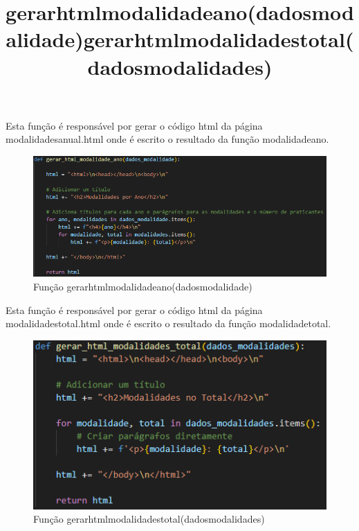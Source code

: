 \documentclass[11pt,a4paper]{report}%
\begin{document}
\title{\textbf{gerar\textunderscore html\textunderscore modalidade\textunderscore ano(dados\textunderscore modalidade)}}

Esta função é responsável por gerar o código html da página modalidades\textunderscore anual.html onde é escrito o resultado da função modalidade\textunderscore ano.


\begin{figure}[htbp]
\centerline{\includegraphics[scale=0.8]{gerar_html_modalidade_ano.png}}
\caption{Função gerar\textunderscore html\textunderscore modalidade\textunderscore ano(dados\textunderscore modalidade)}
\label{fig}
\end{figure}


\newpage
\title{\textbf{gerar\textunderscore html\textunderscore modalidades\textunderscore total(dados\textunderscore modalidades)}}

Esta função é responsável por gerar o código html da página modalidades\textunderscore total.html onde é escrito o resultado da função modalidade\textunderscore total.


\begin{figure}[htbp]
\centerline{\includegraphics[scale=0.8]{gerar_html_modalidades_total.png}}
\caption{Função gerar\textunderscore html\textunderscore modalidades\textunderscore total(dados\textunderscore modalidades)}
\label{fig}
\end{figure}
\end{document}
